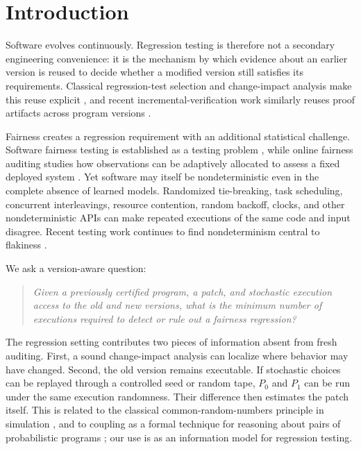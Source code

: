 \section{Introduction}
\label{sec:intro}

Software evolves continuously.  Regression testing is therefore not a secondary
engineering convenience: it is the mechanism by which evidence about an earlier
version is reused to decide whether a modified version still satisfies its
requirements.  Classical regression-test selection and change-impact analysis
make this reuse explicit \cite{RothermelHarrold1996,YooHarman2012,LiSunLeungZhang2013},
and recent incremental-verification work similarly reuses proof artifacts across
program versions \cite{YinEtAl2025}.

Fairness creates a regression requirement with an additional statistical
challenge.  Software fairness testing is established as a testing problem
\cite{GalhotraBrunMeliou2017}, while online fairness auditing studies how observations can be adaptively
allocated to assess a fixed deployed system \cite{ManerikerBurleyParthasarathy2023}.  Yet
software may itself be nondeterministic even in the complete absence of learned
models.  Randomized tie-breaking, task scheduling, concurrent interleavings,
resource contention, random backoff, clocks, and other nondeterministic APIs can
make repeated executions of the same code and input disagree.  Recent testing
work continues to find nondeterminism central to flakiness \cite{YuanLinShi2026}.

We ask a version-aware question:
\begin{quote}
\emph{Given a previously certified program, a patch, and stochastic execution
access to the old and new versions, what is the minimum number of executions
required to detect or rule out a fairness regression?}
\end{quote}

The regression setting contributes two pieces of information absent from fresh
auditing.  First, a sound change-impact analysis can localize where behavior may
have changed.  Second, the old version remains executable.  If stochastic choices
can be replayed through a controlled seed or random tape, $P_0$ and $P_1$ can be
run under the same execution randomness.  Their difference then estimates the
patch itself.  This is related to the classical common-random-numbers principle in
simulation \cite{GlassermanYao1992}, and to coupling as a formal technique for
reasoning about pairs of probabilistic programs \cite{BartheEtAl2017}; our use is
as an information model for regression testing.

